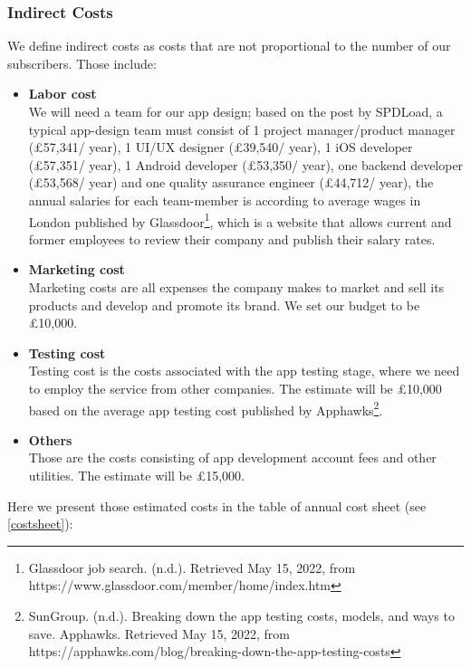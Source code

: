 \subsubsection{Indirect Costs}
We define indirect costs as costs that are not proportional to the number of our subscribers. Those include:
\begin{itemize}
\item \textbf{Labor cost}
\\We will need a team for our app design; based on the post by SPDLoad, a typical app-design team must consist of 1 project manager/product manager (£57,341/ year), 1 UI/UX designer (£39,540/ year), 1 iOS developer (£57,351/ year), 1 Android developer (£53,350/ year), one backend developer (£53,568/ year) and one quality assurance engineer (£44,712/ year), the annual salaries for each team-member is according to average wages in London published by Glassdoor\footnote{Glassdoor job search. (n.d.). Retrieved May 15, 2022, from https://www.glassdoor.com/member/home/index.htm }, which is a website that allows current and former employees to review their company and publish their salary rates.
\item \textbf{Marketing cost}
\\ Marketing costs are all expenses the company makes to market and sell its products and develop and promote its brand. We set our budget to be £10,000.
\item \textbf{Testing cost}
\\ Testing cost is the costs associated with the app testing stage, where we need to employ the service from other companies. The estimate will be £10,000 based on the average app testing cost published by Apphawks\footnote{SunGroup. (n.d.). Breaking down the app testing costs, models, and ways to save. Apphawks. Retrieved May 15, 2022, from https://apphawks.com/blog/breaking-down-the-app-testing-costs }.
\item \textbf{Others}
\\Those are the costs consisting of app development account fees and other utilities. The estimate will be £15,000.
\end{itemize}

Here we present those estimated costs in the table of annual cost sheet (see \cref{costsheet}):

